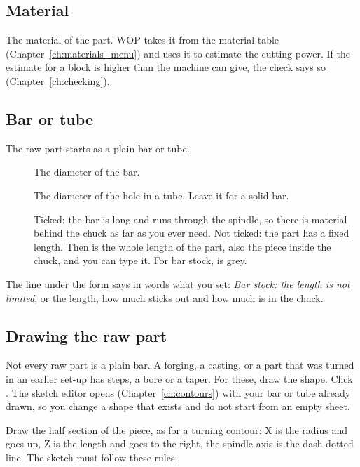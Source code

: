 \subsection{Material}
The material of the part. WOP takes it from the material table (Chapter~\ref{ch:materials_menu}) and uses it to estimate the cutting power. If the estimate for a block is higher than the machine can give, the check says so (Chapter~\ref{ch:checking}).

\subsection{Bar or tube}
The raw part starts as a plain bar or tube.

\begin{description}
\item[] The diameter of the bar.
\item[] The diameter of the hole in a tube. Leave it  for a solid bar.
\item[] Ticked: the bar is long and runs through the spindle, so there is material behind the chuck as far as you ever need. Not ticked: the part has a fixed length. Then  is the whole length of the part, also the piece inside the chuck, and you can type it. For bar stock,  is grey.
\end{description}

The line under the form says in words what you set: \emph{Bar stock: the length is not limited}, or the length, how much sticks out and how much is in the chuck.

\subsection{Drawing the raw part}\label{sec:project:draw}
Not every raw part is a plain bar. A forging, a casting, or a part that was turned in an earlier set-up has steps, a bore or a taper. For these, draw the shape. Click . The sketch editor opens (Chapter~\ref{ch:contours}) with your bar or tube already drawn, so you change a shape that exists and do not start from an empty sheet.


Draw the half section of the piece, as for a turning contour: X is the radius and goes up, Z is the length and goes to the right, the spindle axis is the dash-dotted line. The sketch must follow these rules:

